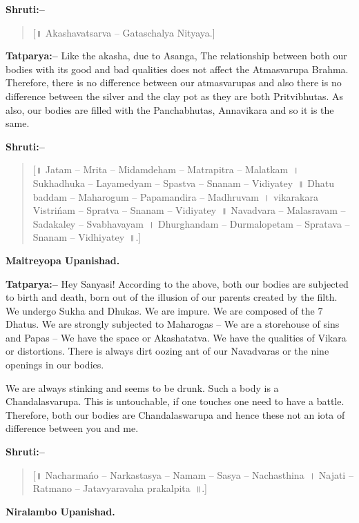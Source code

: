 \textbf{Shruti:–}

\begin{verse}
[॥ Akashavatsarva – Gataschalya Nityaya.]
\end{verse}

\textbf{Tatparya:–} Like the akasha, due to Asanga, The relationship between both our bodies with its good and bad qualities does not affect the Atmasvarupa Brahma. Therefore, there is no difference between our atmasvarupas and also there is no difference between the silver and the clay pot as they are both Pritvibhutas. As also, our bodies are filled with the Panchabhutas, Annavikara and so it is the same.

\textbf{Shruti:–}

\begin{verse}
[॥ Jatam – Mrita – Midamdeham – Matrapitra – Malatkam~। Sukhadhuka – Layamedyam – Spastva – Snanam – Vidiyatey~॥ Dhatu baddam – Maharogum – Papamandira – Madhruvam~। vikarakara Vistrińam – Spratva – Snanam – Vidiyatey~॥ Navadvara – Malasravam – Sadakaley – Svabhavayam~। Dhurghandam – Durmalopetam – Spratava – Snanam – Vidhiyatey~॥.]
\end{verse}

\begin{flushright}
\textbf{Maitreyopa Upanishad.}
\end{flushright}

\textbf{Tatparya:–} Hey Sanyasi! According to the above, both our bodies are subjected to birth and death, born out of the illusion of our parents created by the filth. We undergo Sukha and Dhukas. We are impure. We are composed of the 7 Dhatus. We are strongly subjected to Maharogas – We are a storehouse of sins and Papas – We have the space or Akashatatva. We have the qualities of Vikara or distortions. There is always dirt oozing ant of our Navadvaras or the nine openings in our bodies.

We are always stinking and seems to be drunk. Such a body is a Chandalasvarupa. This is untouchable, if one touches one need to have a battle. Therefore, both our bodies are Chandalaswarupa and hence these not an iota of difference between you and me.

\textbf{Shruti:–}

\begin{verse}
[॥ Nacharmańo – Narkastasya – Namam – Sasya – Nachasthina~। Najati – Ratmano – Jatavyaravaha prakalpita~॥.]
\end{verse}

\begin{flushright}
\textbf{Niralambo Upanishad.}
\end{flushright}

